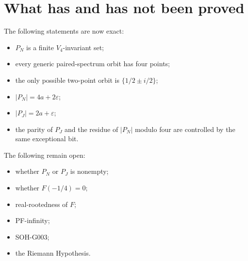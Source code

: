 \section{What has and has not been proved}

The following statements are now exact:
\begin{itemize}
 \item $P_N$ is a finite $V_4$-invariant set;
 \item every generic paired-spectrum orbit has four points;
 \item the only possible two-point orbit is $\{1/2\pm i/2\}$;
 \item $|P_N|=4a+2\varepsilon$;
 \item $|P_J|=2a+\varepsilon$;
 \item the parity of $P_J$ and the residue of $|P_N|$ modulo four are controlled by the same exceptional bit.
\end{itemize}

The following remain open:
\begin{itemize}
 \item whether $P_N$ or $P_J$ is nonempty;
 \item whether $F(-1/4)=0$;
 \item real-rootedness of $F$;
 \item PF-infinity;
 \item SOH-G003;
 \item the Riemann Hypothesis.
\end{itemize}
